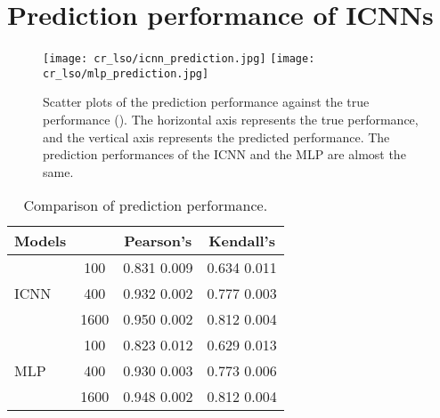 \documentclass[10pt,twocolumn,letterpaper]{article}
\begin{document}
\section{Prediction performance of ICNNs}
\begin{figure}[htbp]
	\centering
	\texttt{[image: cr\_lso/icnn\_prediction.jpg]}
	\texttt{[image: cr\_lso/mlp\_prediction.jpg]}
	\caption{Scatter plots of the prediction performance against the true performance (). The horizontal axis represents the true performance, and the vertical axis represents the predicted performance. The prediction performances of the ICNN and the MLP are almost the same.}
	\label{fig:prediction_performance}
\end{figure}
\begin{table}[htbp]
	\centering
	\caption{Comparison of prediction performance.}
	\begin{tabular}{lccc}
		\toprule
		Models &  & Pearson's  & Kendall's  \\
		\midrule
		\multirow{3}{*}{ICNN} & 100 & 0.831  0.009 & 0.634  0.011 \\
		{} & 400 & 0.932  0.002 & 0.777  0.003 \\
		{} & 1600 & 0.950  0.002 & 0.812  0.004 \\		
		\midrule
		\multirow{3}{*}{MLP} & 100 & 0.823  0.012 & 0.629  0.013 \\
		{} & 400 & 0.930  0.003 & 0.773  0.006 \\
		{} & 1600 & 0.948  0.002 & 0.812  0.004 \\
		\bottomrule
	\end{tabular}
	\label{tab:prediction_performance}
\end{table}
\end{document}
